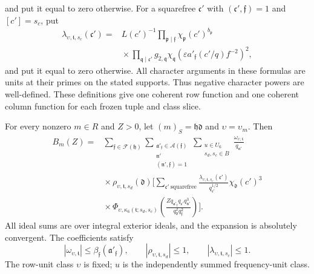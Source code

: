 and put it equal to zero otherwise.  For a squarefree \(\mathfrak c'\)
with \((\mathfrak c',\mathfrak f)=1\) and \([c']=s_c\), put
\begin{equation}\label{eq:reflection-column-factor}
\begin{split}
 \lambda_{\upsilon,\mathfrak t,s_c}(\mathfrak c')
  ={}&L(c')^{-1}
       \prod_{\mathfrak p\mid\mathfrak f}
                 \chi_{\mathfrak p}(c')^{b_{\mathfrak p}}\\
    &{}\times\prod_{\mathfrak q\mid\mathfrak c'}
       g_{2,\mathfrak q}
       \chi_{\mathfrak q}\!\left(
          \varepsilon a'_{\mathfrak f}(c'/q)f^{-2}\right)^2,
\end{split}
\end{equation}
and put it equal to zero otherwise.  All character arguments in these
formulas are units at their primes on the stated supports.  Thus negative
character powers are well-defined.  These definitions give one coherent
row function and one coherent column function for each frozen tuple and
class slice.

\begin{lemma}\label{lem:reflection-quadratic-pairing}
For every nonzero \(m\in R\) and \(Z>0\), let
\((m)_S=\mathfrak h\mathfrak d\) and \(\upsilon=\upsilon_m\).  Then
\begin{equation}\label{eq:reflection-global-expansion}
\begin{split}
 B_m(Z)
  ={}&\sum_{\mathfrak f\in\mathcal F(\mathfrak h)}
      \sum_{\substack{\mathfrak a'_{\mathfrak f}\in\mathcal A(\mathfrak f)\\
                      \mathfrak n'\\(\mathfrak n',\mathfrak f)=1}}
      \sum_{\substack{u\in U_6\\s_d,s_c\in B}}
       \frac{\omega_{\upsilon,\mathfrak t}}{q_{\mathfrak n'}}\\
   &{}\times\rho_{\upsilon,\mathfrak t,s_d}(\mathfrak d)
      \Biggl[\sum_{\mathfrak c'\ \mathrm{squarefree}}
       \frac{\lambda_{\upsilon,\mathfrak t,s_c}(\mathfrak c')}
            {q_{\mathfrak c'}^{1/2}}
       \chi_{\mathfrak d}(c')^3\\
   &{}\times\Phi_{\upsilon,\kappa_6(\mathfrak t;s_d,s_c)}
       \!\left(\frac{Zq_{\mathfrak a'_{\mathfrak f}}
                     q_{\mathfrak c'}q_{\mathfrak n'}^3}
                    {q_{\mathfrak d}^2q_{\mathfrak f}^2}\right)\Biggr].
\end{split}
\end{equation}
All ideal sums are over integral exterior ideals, and the expansion is
absolutely convergent.  The coefficients satisfy
\[
 |\omega_{\upsilon,\mathfrak t}|
     \le\beta_{\mathfrak f}(\mathfrak a'_{\mathfrak f}),\qquad
 |\rho_{\upsilon,\mathfrak t,s_d}|\le1,\qquad
 |\lambda_{\upsilon,\mathfrak t,s_c}|\le1.
\]
The row-unit class \(\upsilon\) is fixed;
\(u\) is the independently summed frequency-unit class.
\end{lemma}

